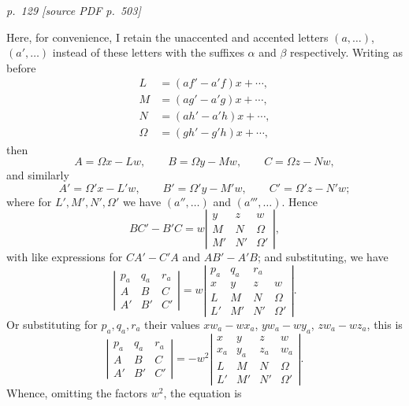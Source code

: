 \documentclass[11pt,a4paper]{article}
\newcommand{\sourcepage}[2]{%
  \bigskip
  \noindent\textit{p.~#1 [source PDF p.~#2]}%
  \par\smallskip
}
\begin{document}
\sourcepage{129}{503}
Here, for convenience, I retain the unaccented and accented letters $(a,\ldots)$,
$(a',\ldots)$ instead of these letters with the suffixes $\alpha$ and $\beta$
respectively. Writing as before
\[
\begin{aligned}
L&=(af'-a'f)x+\cdots,\\
M&=(ag'-a'g)x+\cdots,\\
N&=(ah'-a'h)x+\cdots,\\
\Omega&=(gh'-g'h)x+\cdots,
\end{aligned}
\]
then
\[
A=\Omega x-Lw,\qquad B=\Omega y-Mw,\qquad C=\Omega z-Nw,
\]
and similarly
\[
A'=\Omega'x-L'w,\qquad B'=\Omega'y-M'w,\qquad C'=\Omega'z-N'w;
\]
where for $L',M',N',\Omega'$ we have $(a'',\ldots)$ and $(a''',\ldots)$. Hence
\[
BC'-B'C
=w\left|\begin{array}{ccc}
y&z&w\\
M&N&\Omega\\
M'&N'&\Omega'
\end{array}\right|,
\]
with like expressions for $CA'-C'A$ and $AB'-A'B$; and substituting, we have
\[
\left|\begin{array}{ccc}
p_a&q_a&r_a\\ A&B&C\\ A'&B'&C'
\end{array}\right|
=w\left|\begin{array}{cccc}
p_a&q_a&r_a&\\
x&y&z&w\\
L&M&N&\Omega\\
L'&M'&N'&\Omega'
\end{array}\right|.
\]
Or substituting for $p_a,q_a,r_a$ their values $xw_a-wx_a$, $yw_a-wy_a$,
$zw_a-wz_a$, this is
\[
\left|\begin{array}{ccc}
p_a&q_a&r_a\\ A&B&C\\ A'&B'&C'
\end{array}\right|
=-w^2\left|\begin{array}{cccc}
x&y&z&w\\
x_a&y_a&z_a&w_a\\
L&M&N&\Omega\\
L'&M'&N'&\Omega'
\end{array}\right|.
\]
Whence, omitting the factors $w^2$, the equation is
\end{document}
